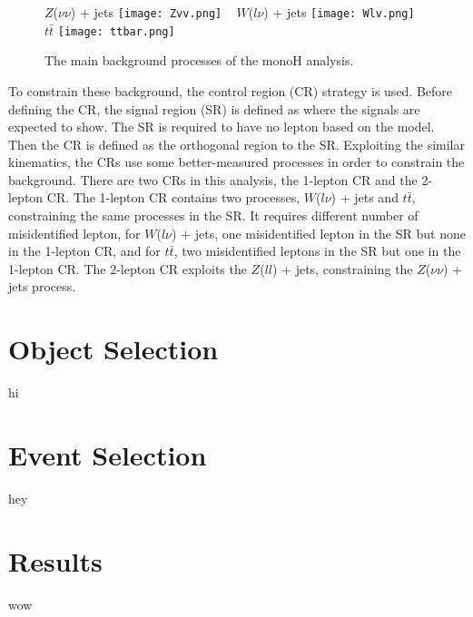 \documentclass[class=NTHU_thesis, crop=false]{standalone}
\begin{document}
\begin{figure}[!hbt]
	\captionsetup[subfigure]{labelformat=empty}
	\centering
	\subcaptionbox
	{$Z$($\nu\nu$) + jets
		\label{fig:subfig_fig1}}
	{\texttt{[image: Zvv.png]}}
	~
	\subcaptionbox
	{$W$($l\nu$) + jets
		\label{fig:subfig_fig2}}
	{\texttt{[image: Wlv.png]}}
	~
	\subcaptionbox
	{$t\bar{t}$
		\label{fig:subfig_fig3}}
	{\texttt{[image: ttbar.png]}}
	\caption{The main background processes of the monoH analysis.}
	\label{fig:label}
\end{figure}

To constrain these background, the control region (CR) strategy is used. Before defining the CR, the signal region (SR) is defined as where the signals are expected to show. The SR is required to have no lepton based on the model. Then the CR is defined as the orthogonal region to the SR. Exploiting the similar kinematics, the CRs use some better-measured processes in order to constrain the background. There are two CRs in this analysis, the 1-lepton CR and the 2-lepton CR. The 1-lepton CR contains two processes, $W$($l\nu$) + jets and $t\bar{t}$, constraining the same processes in the SR. It requires different number of misidentified lepton, for $W$($l\nu$) + jets, one misidentified lepton in the SR but none in the 1-lepton CR, and for $t\bar{t}$, two misidentified leptons in the SR but one in the 1-lepton CR. The 2-lepton CR exploits the $Z$($ll$) + jets, constraining the $Z$($\nu\nu$) + jets process.

\section{Object Selection}
hi

\section{Event Selection}
hey

\section{Results}
wow
\end{document}
